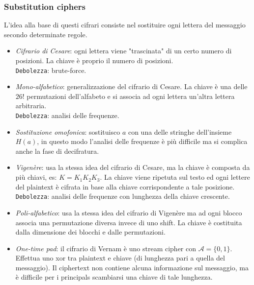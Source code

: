 \documentclass[a4paper, 11pt, twoside, openright, fleqn]{report}
\begin{document}
\subsubsection{Substitution ciphers}
L'idea alla base di questi cifrari consiste nel sostituire ogni lettera del messaggio secondo determinate regole.
\begin{itemize}
	\item \emph{Cifrario di Cesare}: ogni lettera viene "trascinata" di un certo numero di posizioni. La chiave è proprio il numero di posizioni.\\
	\texttt{Debolezza}: brute-force.
	\item \emph{Mono-alfabetico}: generalizzazione del cifrario di Cesare. La chiave è una delle $26!$ permutazioni dell'alfabeto e si associa ad ogni lettera un'altra lettera arbitraria.\\
	\texttt{Debolezza}: analisi delle frequenze.
	\item \emph{Sostituzione omofonica}: sostituisco $a$ con una delle stringhe dell'insieme $H(a)$, in questo modo l'analisi delle frequenze è più difficile ma si complica anche la fase di decifratura.
	\item \emph{Vigenère}: usa la stessa idea del cifrario di Cesare, ma la chiave è composta da più chiavi, es: $K = K_1K_2K_3$. La chiave viene ripetuta sul testo ed ogni lettere del plaintext è cifrata in base alla chiave corrispondente a tale posizione.\\
	\texttt{Debolezza}: analisi delle frequenze con lunghezza della chiave crescente.
	\item \emph{Poli-alfabetico}: usa la stessa idea del cifrario di Vigenère ma ad ogni blocco associa una permutazione diversa invece di uno shift. La chiave è costituita dalla dimensione dei blocchi e dalle permutazioni.
	\item \emph{One-time pad}: il cifrario di Vernam è uno stream cipher con $\mathcal{A}=\{0,1\}$. Effettua uno xor tra plaintext e chiave (di lunghezza pari a quella del messaggio). Il ciphertext non contiene alcuna informazione sul messaggio, ma è difficile per i principals scambiarsi una chiave di tale lunghezza.
\end{itemize}
\end{document}
